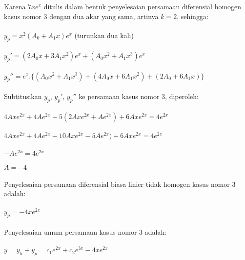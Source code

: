 \begin{enumerate}[1.]
	Karena \begin{math} 7xe^{x} \end{math} ditulis dalam bentuk penyelesaian persamaan diferensial homogen kasus nomor 3 dengan dua akar yang sama, artinya \begin{math} k = 2 \end{math}, sehingga: \\ \\
	\begin{math} y_p = x^{2} (A_0 + A_1 x) e^{x} \end{math} (turunkan dua kali) \\ \\
	\begin{math} y_p' = (2 A_0 x + 3 A_1 x^{2}) e^{x} + (A_0 x^{2} + A_1 x^{3}) e^{x} \end{math} \\ \\
	\begin{math} y_p'' = e^{x} . \bigg\{ (A_0 x^{2} + A_1 x^{3}) + (4 A_0 x + 6 A_1 x^{2}) + (2 A_0 + 6 A_1 x) \bigg\} \end{math} \\ \\
	Subtitusikan \begin{math} y_p \end{math}, \begin{math} y_p' \end{math}, \begin{math} y_ p'' \end{math} ke persamaan kasus nomor 3, diperoleh: \\ \\
	\begin{math}  4Axe^{2x} + 4Ae^{2x} -5 (2Axe^{2x} + Ae^{2x}) + 6Axe^{2x} = 4e^{2x} \end{math} \\ \\
	\begin{math}  4Axe^{2x} + 4Ae^{2x} -10Axe^{2x} - 5Ae^{2x}) + 6Axe^{2x} = 4e^{2x} \end{math} \\ \\
	\begin{math} -Ae^{2x} = 4e^{2x} \end{math} \\ \\
	\begin{math} A = -4 \end{math} \\ \\
	Penyelesaian persamaan diferensial biasa linier tidak homogen kasus nomor 3 adalah: \\ \\
	\begin{math} y_p = -4xe^{2x} \end{math} \\ \\
	Penyelesaian umum persamaan kasus nomor 3 adalah: \\ \\
	\begin{math} y = y_h + y_p = c_1 e^{2x} + c_2 e^{3x} - 4xe^{2x} \end{math} 


\end{enumerate}
